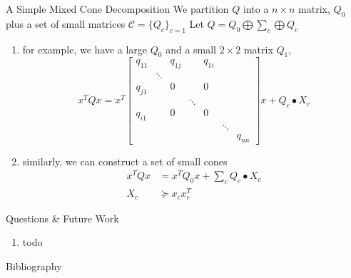 \documentclass[aspectratio=1610, 10pt]{beamer}
\begin{document}
\begin{frame}[allowframebreaks]{A Simple Mixed Cone Decomposition}
  We partition \(Q\) into a \(n\times n\) matrix, \(Q_0\) plus a set of small matrices \(\mathcal C = \{Q_c\}_{c=1}\)
  Let \(Q = Q_0 \bigoplus \sum_c \bigoplus Q_c\)

  \begin{enumerate}
    \item for example, we have a large \(Q_0\) and a small \(2\times 2\) matrix \(Q_1\),
          \begin{equation*}
            x^T Q x = x^T \begin{bmatrix}
              q_{11}  &        & q_{1 j} &        & q_{1 i} &        &         \\
                      & \ddots &         &        &         &        &         \\
              q_{j 1} &        & 0       &        & 0       &        &         \\
                      &        &         & \ddots &         &        &         \\
              q_{i 1} &        & 0       &        & 0       &        &         \\
                      &        &         &        &         & \ddots &         \\
                      &        &         &        &         &        & q_{n n}
            \end{bmatrix} x + Q_c \bullet X_c
          \end{equation*}

          \framebreak
    \item similarly, we can construct a set of small cones
          \begin{align*}
            x^TQx & = x^TQ_0x + \sum_c Q_c \bullet X_c \\
            X_c   & \succeq x_c x_c^T
          \end{align*}
  \end{enumerate}
\end{frame}

\begin{frame}[allowframebreaks]{Questions \& Future Work}
  \begin{enumerate}
    \item todo
  \end{enumerate}


\end{frame}
\begin{frame}[allowframebreaks]{Bibliography}
  
  
\end{frame}
\end{document}
